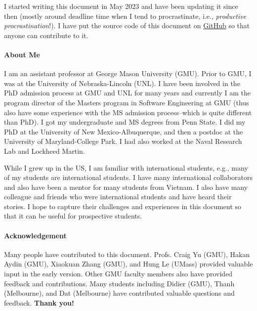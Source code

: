\documentclass[11pt]{article}
\begin{document}
I started writing this document in May 2023 and have been updating it since then (mostly around deadline time when I tend to procrastinate, i.e., \emph{productive procrastination}!). I have put the source code of this document on \href{https://github.com/nguyenthanhvuh/phd-cs-us}{GitHub} so that anyone can contribute to it.  

\paragraph{About Me} I am an assistant professor at George Mason University (GMU). Prior to GMU, I was at the University of Nebraska-Lincoln (UNL). I have been involved in the PhD admission process at GMU and UNL for many years and currently I am the program director of the Masters program in Software Engineering at GMU (thus also have some experience with the MS admission process--which is quite different than PhD). I got my undergraduate and MS degrees from Penn State. I did my PhD at the University of New Mexico-Albuquerque, and then a postdoc at the University of Maryland-College Park.  I had also worked at the Naval Research Lab and Lockheed Martin.

While I grew up in the US, I am familiar with international students, e.g., many of my students are international students.  I have many international collaborators and also have been a mentor for many students from Vietnam.  I also have many colleague and friends who were international students and have heard their stories.  I hope to capture their challenges and experiences in this document so that it can be useful for prospective students.

\paragraph{Acknowledgement} Many people have contributed to this document.
Profs. Craig Yu (GMU), Hakan Aydin (GMU), 
Xiaokuan Zhang (GMU), and Hung Le (UMass) provided valuable input in the early version. Other GMU faculty members also have provided feedback and contributions.  Many students including Didier (GMU), Thanh (Melbourne), and Dat (Melbourne) have contributed valuable questions and feedback. 
\textbf{Thank you!}





\end{document}
